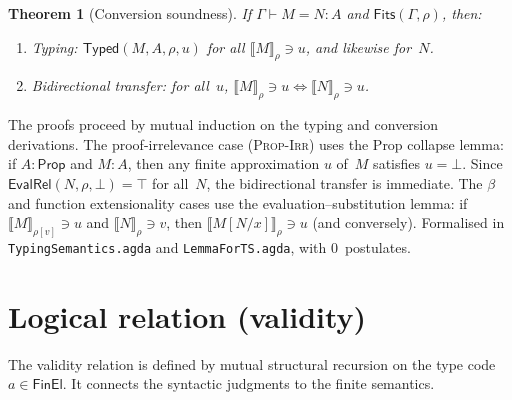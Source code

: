 \documentclass[11pt]{article}
\newcommand{\conveq}[4]{#1 \vdash #2 = #3 : #4}
\newcommand{\Prop}{\mathsf{Prop}}
\newcommand{\FinEl}{\mathsf{FinEl}}
\newcommand{\Bot}{\bot}
\newcommand{\EvalRel}[3]{\llbracket #1 \rrbracket_{#2} \ni #3}
\newtheorem{theorem}{Theorem}
\begin{document}
\begin{theorem}[Conversion soundness]
  \label{thm:conv-sound}
  If\/ $\conveq{\Gamma}{M}{N}{A}$ and $\mathsf{Fits}(\Gamma,\rho)$,
  then:
  \begin{enumerate}
    \item Typing: $\mathsf{Typed}(M,A,\rho,u)$ for all
      $\EvalRel{M}{\rho}{u}$, and likewise for~$N$.
    \item Bidirectional transfer: for all~$u$,
      $\EvalRel{M}{\rho}{u} \Longleftrightarrow \EvalRel{N}{\rho}{u}$.
  \end{enumerate}
\end{theorem}

The proofs proceed by mutual induction on the typing and conversion
derivations.  The proof-irrelevance case (\textsc{Prop-Irr}) uses the
Prop collapse lemma: if $A : \Prop$ and $M : A$, then any finite
approximation $u$ of~$M$ satisfies $u = \Bot$.  Since
$\mathsf{EvalRel}(N, \rho, \Bot) = \top$ for all~$N$, the
bidirectional transfer is immediate.
The $\beta$ and function extensionality cases use the
evaluation--substitution lemma: if $\EvalRel{M}{\rho[v]}{u}$ and
$\EvalRel{N}{\rho}{v}$, then
$\EvalRel{M[N/x]}{\rho}{u}$ (and conversely).
Formalised in \texttt{TypingSemantics.agda} and
\texttt{LemmaForTS.agda}, with 0~postulates.

\section{Logical relation (validity)}

The validity relation is defined by mutual structural recursion on
the type code~$a \in \FinEl$.  It connects the syntactic judgments
to the finite semantics.
\end{document}
